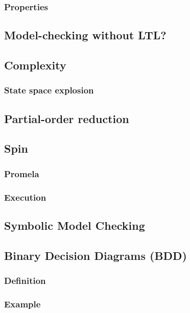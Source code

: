 \documentclass[12pt, a4paper]{book}
\begin{document}
  \subsubsection{Properties}
  \label{subs:Properties}
  \subsection{Model-checking without LTL?}
  \label{sub:Model-checking without LTL?}
  \subsection{Complexity}
  \label{sub:Complexity}
  \subsubsection{State space explosion}
  \label{subs:State space explosion}
  \subsection{Partial-order reduction}
  \label{sub:Partial-order reduction}
  \subsection{Spin}
  \label{sub:Spin}
  \subsubsection{Promela}
  \label{subs:Promela}
  \subsubsection{Execution}
  \label{subs:Execution}
  \subsection{Symbolic Model Checking}
  \label{sub:Symbolic Model Checking}
  \subsection{Binary Decision Diagrams (BDD)}
  \label{sub:Binary Decision Diagrams (BDD)}
  \subsubsection{Definition}
  \label{subs:Definition}
  \subsubsection{Example}
  \label{subs:Example}
\end{document}
